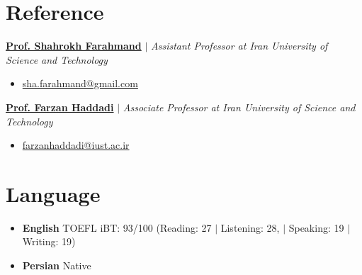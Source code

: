 \documentclass[11pt,a4paper,sans]{moderncv}        %
\begin{document}
\section{Reference}
 {}{\href{https://scholar.google.nl/citations?user=wulBErEAAAAJ&hl=en}{\textbf{Prof. Shahrokh Farahmand}} $|$ \textit{Assistant Professor at Iran University of Science and Technology}}
\begin{itemize}
    \item \href {mailto: sha.farahmand@gmail.com}{sha.farahmand@gmail.com}
\end{itemize}

\vspace{2 mm}
{}{\href{https://its.iust.ac.ir/profile/en/farzanhaddadi}{\textbf{Prof. Farzan Haddadi}} $|$ \textit{Associate Professor at Iran University of Science and Technology}}
\begin{itemize}
    \item \href {mailto: farzanhaddadi@iust.ac.ir}{farzanhaddadi@iust.ac.ir}
\end{itemize}

\section{Language}
\begin{itemize}
    \item \textbf{English} {TOEFL iBT: 93/100 (Reading: 27 $|$ Listening: 28, $|$ Speaking: 19 $|$ Writing: 19)}
\end{itemize}
\vspace{2 mm}
\begin{itemize}
    \item \textbf{Persian} {Native}
\end{itemize}
\end{document}
